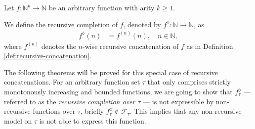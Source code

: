 \begin{definition}
	\label{def:recursive-completion}
	Let $f:\mathbb{N}^k\to\mathbb{N}$ be an arbitrary function with arity $k\geq 1$. 
	
	We define the recursive completion of $f$, denoted by $f^{\lozenge}:\mathbb{N}\to\mathbb{N}$, as
	\begin{align}
		f^{\lozenge}(n) &= f^{(n)}(n), \quad n\in\mathbb{N},
	\end{align}
	where $f^{(n)}$ denotes the $n$-wise recursive concatenation of $f$ as in Definition \ref{def:recursive-concatenation}.
\end{definition}
The following theorems will be proved for this special case of recursive concatenations.
For an arbitrary function set $\tau$ that only comprises strictly monotonously increasing and bounded functions, we are going to show that $f_\tau^{\lozenge}$ --- referred to as the \textit{recursive completion over $\tau$} --- is not expressible by non-recursive functions over $\tau$, briefly $f_\tau^{\lozenge} \notin \mathcal{F}_{\tau}$.
This implies that any non-recursive model on $\tau$ is not able to express this function.

